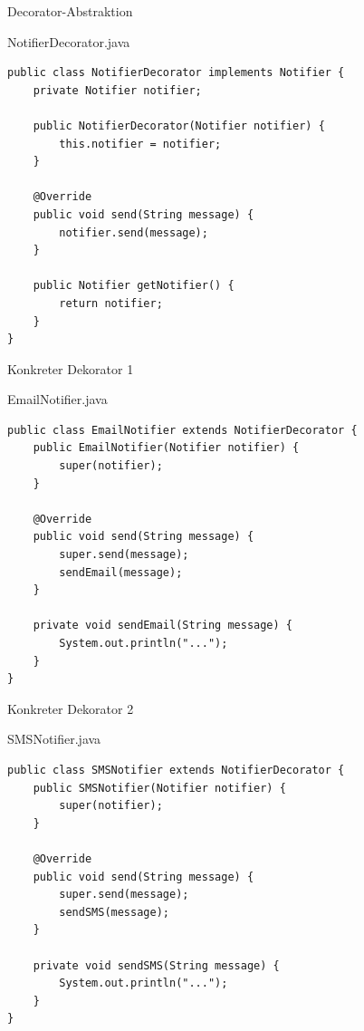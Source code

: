 \begin{frame}[fragile]{Decorator-Abstraktion}
	\begin{exampleblock}{NotifierDecorator.java}
        \begin{lstlisting}
public class NotifierDecorator implements Notifier {
    private Notifier notifier;

    public NotifierDecorator(Notifier notifier) {
        this.notifier = notifier;
    }

    @Override
    public void send(String message) {
    	notifier.send(message);
    }
    
    public Notifier getNotifier() {
		return notifier;
	}
}
        \end{lstlisting}
	\end{exampleblock}
\end{frame}

\begin{frame}[fragile]{Konkreter Dekorator 1}
	\begin{exampleblock}{EmailNotifier.java}
        \begin{lstlisting}
public class EmailNotifier extends NotifierDecorator {
    public EmailNotifier(Notifier notifier) {
        super(notifier);
    }

    @Override
    public void send(String message) {
        super.send(message);
        sendEmail(message);
    }

    private void sendEmail(String message) {
        System.out.println("...");
    }
}
        \end{lstlisting}
	\end{exampleblock}
\end{frame}

\begin{frame}[fragile]{Konkreter Dekorator 2}
	\begin{exampleblock}{SMSNotifier.java}
        \begin{lstlisting}
public class SMSNotifier extends NotifierDecorator {
    public SMSNotifier(Notifier notifier) {
        super(notifier);
    }

    @Override
    public void send(String message) {
        super.send(message);
        sendSMS(message);
    }

    private void sendSMS(String message) {
        System.out.println("...");
    }
}
        \end{lstlisting}
	\end{exampleblock}
\end{frame}

